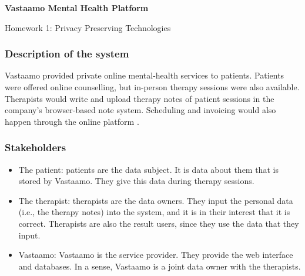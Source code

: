 \documentclass[parskip=half]{scrartcl}
\begin{document}


\begin{center}
    \Large
    \textsf{\textbf{Vastaamo  Mental Health Platform}}
        
    \vspace{0.4cm}
    \large
    Homework 1: Privacy Preserving Technologies
        
    \vspace{0.4cm}
    \docauthor{}
       
    \vspace{0.9cm}
\end{center}

\subsubsection*{Description of the system}


Vastaamo provided private online mental-health services to patients. Patients
were offered online counselling, but in-person therapy sessions were also
available. Therapists would write and upload therapy notes of patient sessions
in the company's browser-based note system. Scheduling and invoicing would also
happen through the online platform \cite{wired1}.

\subsubsection*{Stakeholders}


\begin{itemize}
    \item The patient: patients are the data subject. It is data about them that
    is stored by Vastaamo. They give this data during therapy sessions.
    \item The therapist: therapists are the data owners. They input the personal
    data (i.e., the therapy notes) into the system, and it is in their interest
    that it is correct. Therapists are also the result users, since they use the
    data that they input.
    \item Vastaamo: Vastaamo is the service provider. They provide the web
    interface and databases. In a sense, Vastaamo is a joint data owner with the
    therapists.
\end{itemize}
\end{document}

